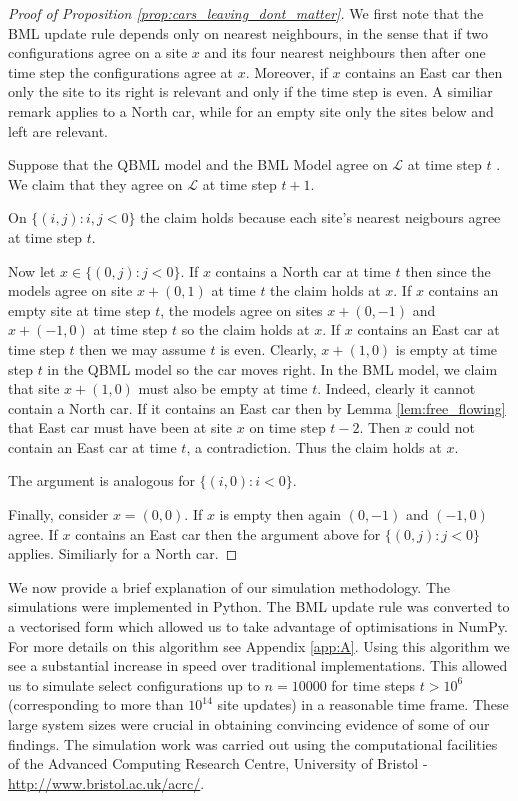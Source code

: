 \documentclass[reqno]{amsart}
\begin{document}
\begin{proof}[Proof of Proposition \ref{prop:cars_leaving_dont_matter}]

       We first note that the BML update rule depends only on nearest neighbours, in the sense that if two configurations agree on a site $x$ and its four nearest neighbours then after one time step the configurations agree at $x$. Moreover, if $x$ contains an East car then only the site to its right is relevant and only if the time step is even. A similiar remark applies to a North car, while for an empty site only the sites below and left are relevant.

        Suppose that the QBML model and the BML Model agree on $\mathcal{L}$ at time step $t$ . We claim that they agree on $\mathcal{L}$ at time step $t+1$.

        On $\{ (i,j) : i,j <0\}$ the claim holds because each site's nearest neigbours agree at time step $t$.
        
        Now let $x \in \{(0,j): j<0\}$. If $x$ contains a North car at time $t$ then since the models agree on site $x+(0,1)$ at time $t$ the claim holds at $x$. If $x$ contains an empty site at time step $t$, the models agree on sites $x+(0,-1)$ and $x+(-1,0)$ at time step $t$ so the claim holds at $x$. If $x$ contains an East car at time step $t$ then we may assume $t$ is even. Clearly, $x+(1,0)$ is empty at time step $t$ in the QBML model so the car moves right. In the BML model, we claim that site $x+(1,0)$ must also be empty at time $t$. Indeed, clearly it cannot contain a North car. If it contains an East car then by Lemma \ref{lem:free_flowing} that East car must have been at site $x$ on time step $t-2$. Then $x$ could not contain an East car at time $t$, a contradiction. Thus the claim holds at $x$. 

        The argument is analogous for $\{(i,0):i<0\}$.

        Finally, consider $x=(0,0)$. If $x$ is empty then again $(0,-1)$ and $(-1,0)$ agree. If $x$ contains an East car then the argument above for $\{(0,j):j<0\}$ applies. Similiarly for a North car.

    
\end{proof}

We now provide a brief explanation of our simulation methodology. The simulations were implemented in Python.  The BML update rule was converted to a vectorised form which allowed us to take advantage of optimisations in NumPy. For more details on this algorithm see Appendix \ref{app:A}. Using this algorithm we see a substantial increase in speed over traditional implementations. This allowed us to simulate select configurations up to $n=10000$ for time steps $t > 10^6$ (corresponding to more than $10^{14}$ site updates) in a reasonable time frame. These large system sizes were crucial in obtaining convincing evidence of some of our findings. The simulation work was carried out using the computational facilities of the Advanced Computing Research Centre, University of Bristol - \url{http://www.bristol.ac.uk/acrc/}. 
\end{document}
